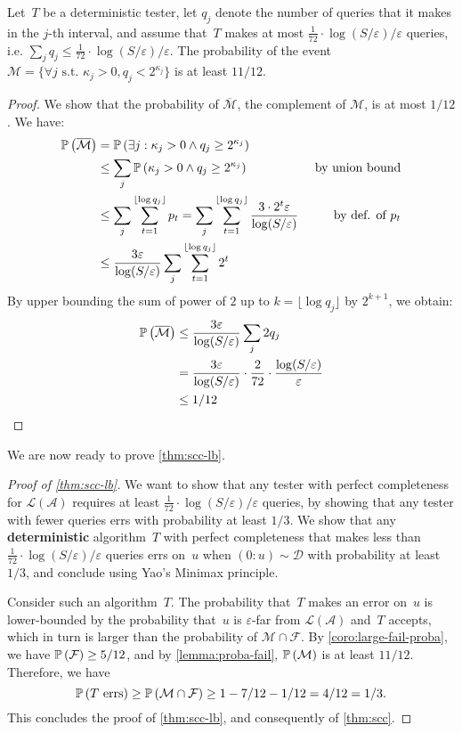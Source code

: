 \documentclass[letterpaper, USenglish, cleveref, autoref, thm-restate, numberwithinsect]{lipics-v2021}
\theoremstyle{theorem}
\theoremstyle{definition}
\newcommand{\Aa}{\mathcal{A}}
\newcommand{\Dd}{\mathcal{D}}
\newcommand{\eps}{\varepsilon}
\newcommand{\Ff}{\mathcal{F}}
\newcommand{\lang}[1]{\mathcal{L}(#1)}
\newcommand{\Mm}{\mathcal{M}}
\newcommand{\PP}{\mathbb{P}}
\newcommand{\timedword}[2]{(#1:#2)}
\newcommand{\twu}{\timedword{0}{u}}
\newcommand{\Prob}[2][]{\ifthenelse{\equal{#1}{}}{\PP}{\PP_{ #1 }}\left( #2 \right)}
\begin{document}
\begin{lemma}\label{lemma:proba-fail}
    Let~$T$ be a deterministic tester, let $q_j$ denote the number of queries that it makes in the $j$-th interval, and assume that~$T$ makes at most $\frac{1}{72}\cdot \log(S/\eps)/\eps$ queries, i.e. $\sum_j q_j \le \frac{1}{72}\cdot \log(S/\eps)/\eps$.
    The probability of the event $\Mm = \{\forall j \text{ s.t. }\kappa_j > 0, q_j < 2^{\kappa_j}\}$ is at least $11/12$.
\end{lemma}
\begin{proof}
    We show that the probability of $\overline{\Mm}$, the complement of $\Mm$, is at most $1/12$.
    We have:
    \begin{align*}
        \Prob{\overline{\Mm}} &=\Prob{\exists j: \kappa_j > 0 \land q_j \ge 2^{\kappa_j}}&\\
        &\le \sum_{j} \Prob{\kappa_j > 0 \land q_j \ge 2^{\kappa_j}} &\text{ by union bound}\\
        &\le \sum_{j} \sum_{t=1}^{\lfloor \log q_j \rfloor} p_t = \sum_{j} \sum_{t=1}^{\lfloor \log q_j \rfloor} \frac{3\cdot 2^t\eps}{\log( S/\eps)}&\text{ by def. of } p_t\\
        &\le \frac{3\eps}{\log( S/\eps)} \sum_{j} \sum_{t=1}^{\lfloor \log q_j \rfloor}  2^t&
    \end{align*}
    By upper bounding the sum of power of $2$ up to $k = \lfloor \log q_j \rfloor$ by $2^{k+1}$, we obtain:
    \begin{align*}
        \Prob{\overline{\Mm}} 
        &\le \frac{3\eps}{\log( S/\eps)} \sum_{j} 2q_j\\
        &= \frac{3\eps}{\log( S/\eps)} \cdot \frac{2}{72}\cdot \frac{\log(S/\eps)}{\eps}\\
        &\le 1/12\qedhere
    \end{align*}
\end{proof}

We are now ready to prove \cref{thm:scc-lb}.
\begin{proof}[Proof of \cref{thm:scc-lb}]
    We want to show that any tester with perfect completeness for $\lang{\Aa}$ requires at least $\frac{1}{72}\cdot \log(S/\eps)/\eps$ queries, by showing that any tester with fewer queries errs with probability at least $1/3$.
    We show that any \textbf{deterministic} algorithm~$T$ with perfect completeness that makes less than $\frac{1}{72}\cdot \log(S/\eps)/\eps$ queries errs on~$u$ when $\twu\sim{}\Dd$ with probability at least $1/3$, and conclude using Yao's Minimax principle.

    Consider such an algorithm~$T$.
    The probability that~$T$ makes an error on~$u$ is lower-bounded by the probability that~$u$ is $\eps$-far from $\lang{\Aa}$ and~$T$ accepts, which in turn is larger than the probability of $\Mm\cap \Ff$.
    By \cref{coro:large-fail-proba}, we have $\Prob{\Ff}\ge 5/12$, and by \cref{lemma:proba-fail}, $\Prob{\Mm}$ is at least $11/12$.
    Therefore, we have
     \[ \Prob{T \text{ errs}} \ge \Prob{\Mm\cap \Ff} \ge 1 - 7/12 - 1/12 = 4/12 = 1/3.\]
    This concludes the proof of \cref{thm:scc-lb}, and consequently of \cref{thm:scc}.
\end{proof}
 
\end{document}
